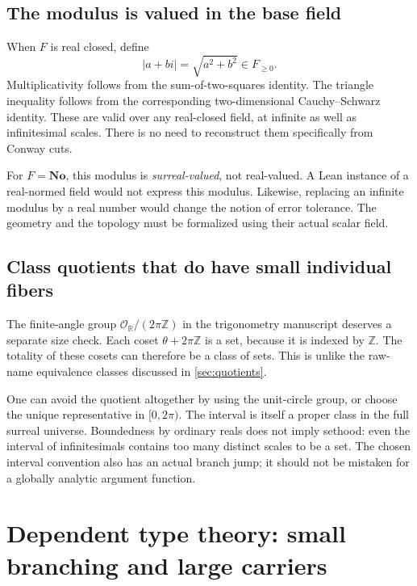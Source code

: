 \documentclass[11pt,letterpaper]{article}
\numberwithin{equation}{section}
\theoremstyle{definition}
\theoremstyle{remark}
\newcommand{\No}{\mathbf{No}}
\newcommand{\R}{\mathbb{R}}
\newcommand{\Z}{\mathbb{Z}}
\newcommand{\OO}{\mathcal{O}}
\begin{document}
\subsection{The modulus is valued in the base field}
When $F$ is real closed, define
\[
 |a+bi|=\sqrt{a^2+b^2}\in F_{\ge0}.
\]
Multiplicativity follows from the sum-of-two-squares identity. The triangle inequality follows from the corresponding two-dimensional Cauchy--Schwarz identity. These are valid over any real-closed field, at infinite as well as infinitesimal scales. There is no need to reconstruct them specifically from Conway cuts.

For $F=\No$, this modulus is \emph{surreal-valued}, not real-valued. A Lean instance of a real-normed field would not express this modulus. Likewise, replacing an infinite modulus by a real number would change the notion of error tolerance. The geometry and the topology must be formalized using their actual scalar field.

\subsection{Class quotients that do have small individual fibers}
The finite-angle group $\OO_{\R}/(2\pi\Z)$ in the trigonometry manuscript deserves a separate size check. Each coset $\theta+2\pi\Z$ is a set, because it is indexed by $\Z$. The totality of these cosets can therefore be a class of sets. This is unlike the raw-name equivalence classes discussed in \cref{sec:quotients}.

One can avoid the quotient altogether by using the unit-circle group, or choose the unique representative in $[0,2\pi)$. The interval is itself a proper class in the full surreal universe. Boundedness by ordinary reals does not imply sethood: even the interval of infinitesimals contains too many distinct scales to be a set. The chosen interval convention also has an actual branch jump; it should not be mistaken for a globally analytic argument function.

\section{Dependent type theory: small branching and large carriers}\label{sec:types}
\end{document}
